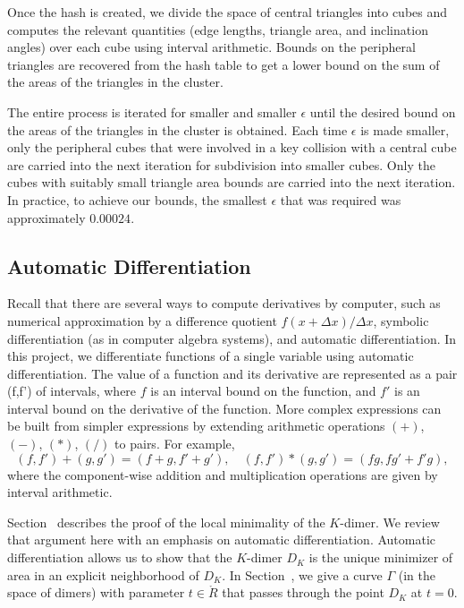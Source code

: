 Once the hash is created, we divide the space of central triangles into cubes and computes the relevant quantities
(edge lengths, triangle area, and inclination angles) over each cube using interval arithmetic.   Bounds on the peripheral
triangles are recovered from the hash table to get a lower bound on the sum of the areas of the triangles in the cluster.

The entire process is iterated for smaller and smaller $\epsilon$ until the desired bound on the areas of the triangles
in the cluster is obtained.   Each time $\epsilon$ is made smaller, only the peripheral cubes that were involved in a
key collision with a central cube are carried into the next iteration for subdivision into smaller cubes.  Only the cubes
with suitably small triangle area bounds are carried into the next iteration.  In practice, to achieve our bounds,
the smallest $\epsilon$ that
was required was approximately $0.00024$.

\subsection{Automatic Differentiation}

Recall that there are several ways to compute derivatives by computer, such as numerical approximation by
a difference quotient $f(x + \Delta x)/\Delta x$, symbolic differentiation (as in computer algebra systems), and
automatic differentiation.   In this project, we differentiate functions of a single variable using automatic differentiation.
The value of a function and its derivative are represented as a pair (f,f') of intervals, where $f$ is an interval bound
on the function, and $f'$ is an interval bound on the derivative of the function.    More complex expressions can be built
from simpler expressions by extending arithmetic operations $(+)$, $(-)$, $(*)$, $(/)$ to pairs.  For example,
\[
(f,f') + (g,g') = (f+g,f'+g'),\quad (f,f') * (g,g') = (f g,f g' + f' g),
\]
where the component-wise addition and multiplication operations are given by interval arithmetic.

Section~ describes the proof of the local minimality of the $K$-dimer.  We review that
argument here with an emphasis on automatic differentiation.
Automatic differentiation allows us to show that the $K$-dimer $D_K$ is the unique minimizer of area
in an explicit neighborhood of $D_K$.  In Section~, we give a curve $\Gamma$ 
(in the space of dimers) with parameter $t\in\ring{R}$
that passes through the point $D_K$ at $t=0$.  

